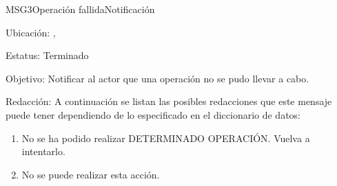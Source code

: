 \begin{mensaje}{MSG3}{Operación fallida}{Notificación}
	\item[Ubicación:] \msjSuperior, \msjEmergente
	\item[Estatus:] Terminado
	\item[Objetivo:] Notificar al actor que una operación no se pudo llevar a cabo.
	\item[Redacción:] A continuación se listan las posibles redacciones que este mensaje puede tener dependiendo de lo especificado en el diccionario de datos:
	\begin{enumerate}
		\item No se ha podido realizar DETERMINADO OPERACIÓN. Vuelva a intentarlo.
		\item No se puede realizar esta acción.
	\end{enumerate}


\end{mensaje}
